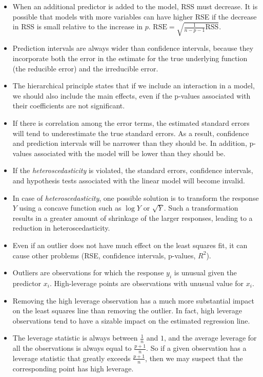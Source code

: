 \documentclass{article}
\begin{document}
\begin{itemize}
    \item When an additional predictor is added to the model, RSS must decrease. It is possible that models with more variables can have higher RSE if the decrease in RSS is small relative to the increase in $p$. $\textrm{RSE}=\sqrt{\frac{1}{n-p-1}\textrm{RSS}}$.
    \item Prediction intervals are always wider than confidence intervals, because they incorporate both the error in the estimate for the true underlying function (the reducible error) and the irreducible error.
    \item The hierarchical principle states that if we include an interaction in a model, we should also include the main effects, even if the p-values associated with their coefficients are not significant.
    \item If there is correlation among the error terms, the estimated standard errors will tend to underestimate the true standard errors. As a result, confidence and prediction intervals will be narrower than they should be. In addition, p-values associated with the model will be lower than they should be.
    \item If the \textit{heteroscedasticity} is violated, the standard errors, confidence intervals, and hypothesis tests associated with the linear model will become invalid.
    \item In case of \textit{heteroscedasticity}, one possible solution is to transform the response $Y$ using a concave function such as $\log Y$ or $\sqrt{Y}$. Such a transformation results in a greater amount of shrinkage of the larger responses, leading to a reduction in heteroscedasticity.
    \item Even if an outlier does not have much effect on the least squares fit, it can cause other problems (RSE, confidence intervals, p-values, $R^2$).
    \item Outliers are observations for which the response $y_i$ is unusual given the predictor $x_i$. High-leverage points are observations with unusual value for $x_i$.
    \item Removing the high leverage observation has a much more substantial impact on the least squares line than removing the outlier. In fact, high leverage observations tend to have a sizable impact on the estimated regression line.
    \item The leverage statistic is always between $\frac{1}{n}$ and $1$, and the average leverage for all the observations is always equal to $\frac{p+1}{n}$. So if a given observation has a leverage statistic that greatly exceeds $\frac{p+1}{n}$, then we may suspect that the corresponding point has high leverage.

\end{itemize}
\end{document}
